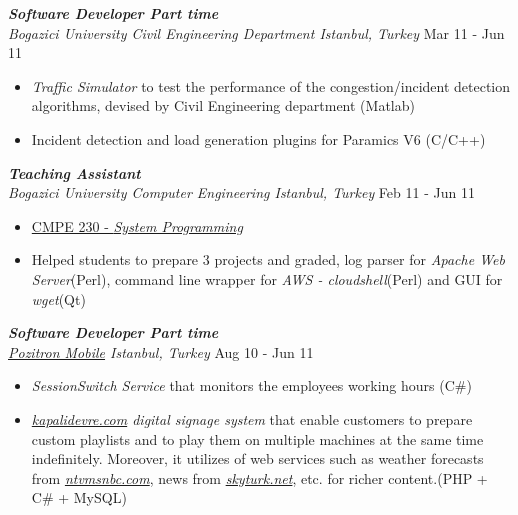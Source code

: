 \documentclass[line, margin]{res}
\begin{document}
\begin{resume}
	{\sl \textbf{Software Developer Part time} \\ Bogazici University Civil Engineering Department Istanbul, Turkey} \hfill Mar 11 - Jun 11 \\
	\vspace{-0.3cm}
	\begin{itemize} \itemsep -2pt
		\item \textit{Traffic Simulator} to test the performance of the congestion/incident detection algorithms, devised by Civil Engineering department (Matlab)
		\item Incident detection and load generation plugins for Paramics V6 (C/C++)
	\end{itemize}

	{\sl \textbf{Teaching Assistant} \\ Bogazici University Computer Engineering Istanbul, Turkey} \hfill Feb 11 - Jun 11 \\
	\vspace{-.3cm} 
	\begin{itemize} \itemsep -2pt
		\item \href{http://www.cmpe.boun.edu.tr/courses/?cmpe=230}{CMPE 230 - \textit{System Programming}}
		\item Helped students to prepare 3 projects and graded, log parser for \textit{Apache Web Server}(Perl), command line wrapper for \textit{AWS - cloudshell}(Perl) and GUI for \textit{wget}(Qt)
	\end{itemize}

	{\sl \textbf{Software Developer Part time} \\ \href{http://www.pozitron.com/}{Pozitron Mobile} Istanbul, Turkey} \hfill Aug 10 - Jun 11 \\
	\vspace{-0.3cm}
	\begin{itemize} \itemsep -2pt
		\item \textit{SessionSwitch Service} that monitors the employees working hours (C\#) 
		\item \textit{\href{http://kapalidevre.com}{kapalidevre.com} digital signage system} that enable customers to prepare custom playlists and to play them on multiple machines at the same time indefinitely. Moreover, it utilizes of web services such as weather forecasts from \textit{\href{http://www.ntvmsnbc.com/}{ntvmsnbc.com}}, news from \textit{\href{http://skyturk.net/}{skyturk.net}}, etc. for richer content.(PHP + C\# + MySQL)
	\end{itemize}


\end{resume}
\end{document}

